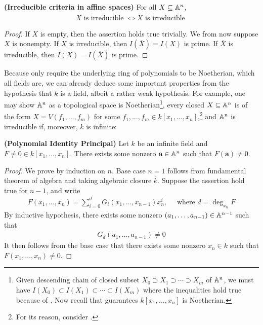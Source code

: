 \documentclass{report}
\begin{document}
\begin{corollary}
\label{Icias}
\textbf{(Irreducible criteria in affine spaces)} For all $X \subseteq \mathbb{A}^n$, 
\begin{align*}
X\text{ is irreducible }\iff \overline{X}\text{ is irreducible }
\end{align*}
\end{corollary}
\begin{proof}
If $X$ is empty, then the assertion holds true trivially. We from now suppose  $X$ is nonempty. If $X$ is irreducible, then $I(\overline{X})=I(X)$ is prime. If $\overline{X}$ is irreducible, then $I(X)=I(\overline{X})$ is prime. 
\end{proof}



Because   only require the underlying ring of polynomials to be Noetherian, which all fields are, we can already deduce some important properties from the hypothesis that $k$ is a field, albeit a rather weak hypothesis.   For example, one may show $\mathbb{A}^n$ as a topological space is Noetherian\footnote{Given descending chain of closed subset $X_0\supset X_1 \supset \cdots \supset X_m$ of $\mathbb{A}^n$, we must have $I(X_0)\subset I(X_1)\subset \cdots \subset I(X_m)$ where the inequalities hold true because of . Now recall that  guarantees $k[x_1,\dots ,x_n]$ is Noetherian.}, every closed $X\subseteq \mathbb{A}^n$ is of the form $X=V(f_1,\dots ,f_m)$ for some $f_1,\dots ,f_m \in k[x_1,\dots ,x_n]$,\footnote{For its reason, consider .}  and $\mathbb{A}^n$ is irreducible if, moreover,  $k$ is infinite: 
\begin{theorem}
\label{PIP}
\textbf{(Polynomial Identity Principal)} Let $k$ be an infinite field and $F\neq 0 \in k[x_1,\dots ,x_n]$. There exists some nonzero $\textbf{a}\in \mathbb{A}^n$ such that $F(\textbf{a})\neq 0$.  
\end{theorem}
\begin{proof}
We prove by induction on $n$. Base case $n=1$ follows from fundamental theorem of algebra and taking algebraic closure  $\overline{k}$. Suppose the assertion hold true for $n-1$, and write 
 \begin{align*}
F(x_1,\dots ,x_n)= \sum_{i=0}^{d} G_i(x_1,\dots ,x_{n-1})x_n^i,\quad \text{ where }d=\operatorname{deg}_{x_n}F
\end{align*}
By inductive hypothesis, there exists some nonzero $(a_1,\dots ,a_{n-1})\in \mathbb{A}^{n-1}$ such that
\begin{align*}
G_d(a_1,\dots ,a_{n-1})\neq 0
\end{align*}
It then follows from the base case that there exists some nonzero $x_n \in k$ such that $F(x_1,\dots ,x_n)\neq 0$.  
\end{proof}
\end{document}
